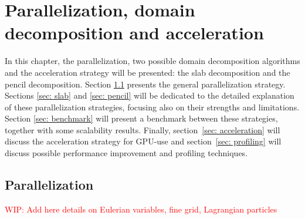 \chapter{Parallelization, domain decomposition and acceleration}
\label{chap: dom_decomp}
In this chapter, the parallelization, two possible domain decomposition algorithms and the acceleration strategy will be presented: the slab decomposition and the pencil decomposition. Section \ref{sec: parallelization} presents the general parallelization strategy. 
Sections \ref{sec: slab} and \ref{sec: pencil} will be dedicated to the detailed explanation of these parallelization strategies, focusing also on their strengths and limitations. 
Section \ref{sec: benchmark} will present a benchmark between these strategies, together with some scalability results.
Finally, section~\ref{sec: acceleration} will discuss the acceleration strategy for GPU-use and section~\ref{sec: profiling} will discuss possible performance improvement and profiling techniques.


\section{Parallelization}
\label{sec: parallelization}
\textcolor{red}{WIP: Add here details on Eulerian variables, fine grid, Lagrangian particles}


